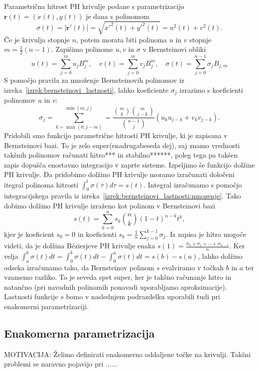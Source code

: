 \documentclass[isrm2, tisk]{fmfdelo}
\begin{document}
    Parametrična hitrost PH krivulje podane s parametrizacijo $\mathbf{r}(t)=(x(t),y(t))$ je dana s polinomom
    \[\sigma(t) = |\mathbf{r}'(t)| = \sqrt{x'^2(t)+y'^2(t)} = u^2(t)+v^2(t).\]
    Če je krivulja stopnje $n$, potem morata biti polinoma $u$ in $v$ stopnje $m=\frac{1}{2}(n-1)$.
    Zapišimo polinome $u,v$ in $\sigma$ v Bernsteinovi obliki \[u(t)=\sum_{j=0}^{m}u_j B_{j}^{m}, \quad v(t)=\sum_{j=0}^{m}v_j B_{j}^{m}, \quad \sigma(t)=\sum_{j=0}^{n-1}\sigma_j B_{j,m}\]
    S pomočjo pravila za množenje Bernsteinovih polinomov iz izreka~\ref{izrek:bernsteinovi_lastnosti}, lahko koeficiente $\sigma_j$ izrazimo s koeficienti polinomov $u$ in $v$:
    \[\sigma_j = \sum_{k=\max(0,j-m)}^{\min(m,j)} = \frac{\binom{m}{k}\binom{m}{j-k}}{\binom{n-1}{j}}(u_k u_{j-k}+v_k v_{j-k}).\]
    Pridobili smo funkcijo parametrične hitrosti PH krivulje, ki je zapisana v Bernsteinovi bazi.
    To je zelo super(enadrugabeseda dej), saj znamo vrednosti takšnih polinomov računati hitro*** in stabilno******, poleg tega pa takšen zapis dopušča enostavno integracijo v zaprte sisteme.
    Izpeljimo še funkcijo dolžine PH krivulje.
    Da pridobimo dolžino PH krivulje moramo izračunati določeni itegral polinoma hitrosti $\int_0^t\sigma(\tau)d\tau=s(t)$.
    Integral izračunamo s pomočjo integracijskega pravila iz izreka~\ref{izrek:bernsteinovi_lastnosti:mnozenje}.
    Tako dobimo dolžino PH krivulje izraženo kot polinom v Bernsteinovi bazi
    \[s(t)=\sum_{k=0}^n s_k \binom{n}{k}(1-t)^{n-k}t^k,\]
    kjer je koeficient $s_0=0$ in koeficienti $s_k = \frac{1}{n}\sum^{k-1}_{j=0}\sigma_j$.
    Iz zapisa je hitro mogoče videti, da je dolžina Bézierjeve PH krivulje enaka $s(1)=\frac{\sigma_0+\sigma_1+\cdots+\sigma_{n-1}}{n}$.
    Ker velja $\int_a^b \sigma(t)dt = \int_0^b\sigma(t)dt - \int_0^a\sigma(t)dt = s(b)-s(a)$, lahko dolžino odseka izračunamo tako, da Bernsteinov polinom $s$ evalviramo v točkah $b$ in $a$ ter vzamemo razliko.
    To je seveda spet super, ker je takšno računanje hitro in natančno (pri navadnih polinomih ponavadi uporabljamo aproksimacije).
    Lastnosti funkcije $s$ bomo v naslednjem podrazdelku uporabili tudi pri enakomerni parametrizaciji.

    \subsection{Enakomerna parametrizacija}
    MOTIVACIJA: Želimo definirati enakomerno oddaljene točke na krivulji. Takšni problemi se naravno pojavijo pri ...... \newline
\end{document}
